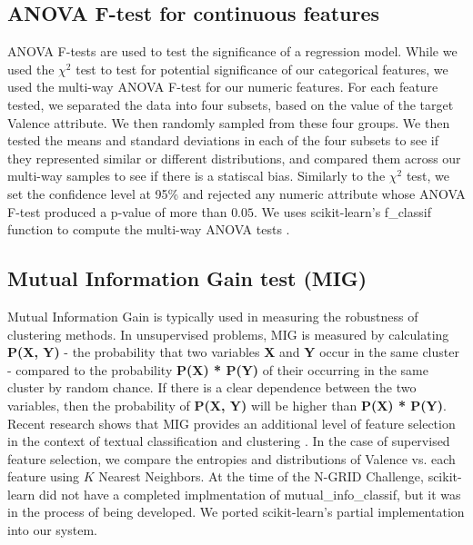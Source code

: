 \subsection{ANOVA F-test for continuous features} 
ANOVA F-tests are used to test the significance of a regression model\cite{anova}.
While we used the $\chi^2$ test to test for potential significance of our 
categorical features, we used the multi-way ANOVA F-test for our numeric features.
For each feature tested, we separated the data into four subsets, based on the 
value of the target {Valence} attribute. We then randomly sampled from these four groups. We then tested the means and standard
deviations in each of the four subsets to see if they represented similar or
different distributions, and compared them across our multi-way samples to see if there is a statiscal bias. Similarly to the $\chi^2$ test, we set the 
confidence level at 95\% and rejected any numeric attribute whose ANOVA F-test
produced a p-value of more than $0.05$.  We uses 
scikit-learn's \textsf{f\_classif} function to 
compute the multi-way ANOVA tests \cite{scikit-learn}. 

\subsection{Mutual Information Gain test (MIG)}

Mutual Information Gain is typically used in measuring the robustness of clustering methods.
In unsupervised problems, MIG  is measured by calculating \textbf{P(X, Y)} - the probability that two variables \textbf{X} and \textbf{Y} occur in the same cluster - compared to the probability \textbf{P(X) * P(Y)} of their occurring in the same cluster by random chance. If there is a clear dependence  %
between the two variables, then the probability of \textbf{P(X, Y)} will be higher %
than \textbf{P(X) * P(Y)}. Recent research shows that MIG provides an additional level of feature selection in the context of textual classification and clustering \cite{Xu07}. In the case of supervised feature selection, we compare the entropies and distributions of \textsf{Valence} vs. each feature
using $K$ Nearest Neighbors. At the time of the N-GRID Challenge, \textsf{scikit-learn} \cite{scikit-learn}
did not have a completed implmentation of
\textsf{mutual\_info\_classif}, but it was in the process of being developed. We ported \textsf{scikit-learn}'s partial implementation into our system.

